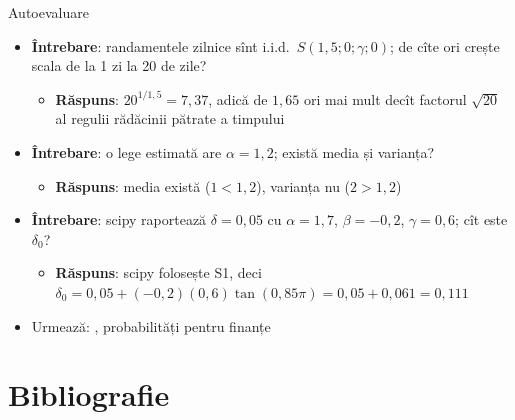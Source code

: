 \begin{frame}{Autoevaluare}
\itemsize{\small}
\begin{itemize}
    \item \textbf{Întrebare}: randamentele zilnice sînt i.i.d.\ $S(1{,}5; 0; \gamma; 0)$; de cîte ori crește scala de la 1 zi la 20 de zile?
    \begin{itemize}
        \item \textbf{Răspuns}: $20^{1/1{,}5} = 7{,}37$, adică de $1{,}65$ ori mai mult decît factorul $\sqrt{20}$ al regulii rădăcinii pătrate a timpului
    \end{itemize}
    \item \textbf{Întrebare}: o lege estimată are $\alpha = 1{,}2$; există media și varianța?
    \begin{itemize}
        \item \textbf{Răspuns}: media există ($1 < 1{,}2$), varianța nu ($2 > 1{,}2$)
    \end{itemize}
    \item \textbf{Întrebare}: scipy raportează $\delta = 0{,}05$ cu $\alpha = 1{,}7$, $\beta = -0{,}2$, $\gamma = 0{,}6$; cît este $\delta_0$?
    \begin{itemize}
        \item \textbf{Răspuns}: scipy folosește S1, deci $\delta_0 = 0{,}05 + (-0{,}2)(0{,}6)\tan(0{,}85\pi) = 0{,}05 + 0{,}061 = 0{,}111$
    \end{itemize}
    \item Urmează: , probabilități pentru finanțe
\end{itemize}
\end{frame}


\section{Bibliografie}

